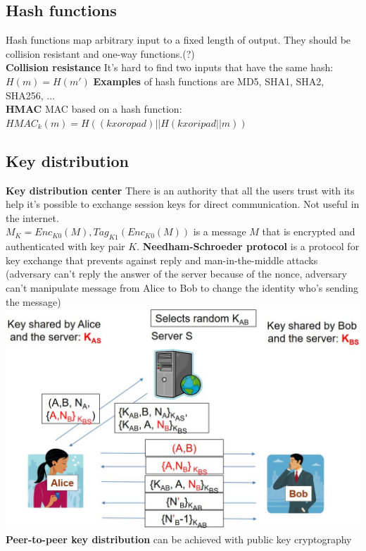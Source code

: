 \documentclass[12pt]{article}
\begin{document}
	\subsection{Hash functions}
	Hash functions map arbitrary input to a fixed length of output. They should be collision resistant and one-way functions.(?)\\
	\textbf{Collision resistance} It's hard to find two inputs that have the same hash: $H(m) = H(m')$
	\textbf{Examples} of hash functions are MD5, SHA1, SHA2, SHA256, ...\\
	\textbf{HMAC} MAC based on a hash function: $HMAC_k(m) = H((k xor opad) || H(k xor ipad || m))$
	
	\subsection{Key distribution}
	\textbf{Key distribution center} There is an authority that all the users trust with its help it's possible to exchange session keys for direct communication. Not useful in the internet.\\
	${M}_K = Enc_{K0}(M), Tag_{K1}(Enc_{K0}(M))$ is a message $M$ that is encrypted and authenticated with key pair $K$.
	\textbf{Needham-Schroeder protocol} is a protocol for key exchange that prevents against reply and man-in-the-middle attacks (adversary can't reply the answer of the server because of the nonce, adversary can't manipulate message from Alice to Bob to change the identity who's sending the message)\\
	\includegraphics[width=\textwidth]{figures/needham-schroeder-protocol.JPG}\\
	\textbf{Peer-to-peer key distribution} can be achieved with public key cryptography
	
\end{document}
